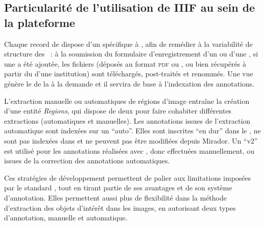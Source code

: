 \hypertarget{particularite-de-utilisation-de-iiif-au-sein-de-la-plateforme}{%
\subsection{Particularité de l'utilisation de IIIF au sein de la
plateforme}\label{particularite-de-utilisation-de-iiif-au-sein-de-la-plateforme}}

Chaque record de \digit dispose d'un \man \iiif spécifique à \eida,
afin de remédier à la variabilité de structure des \mans~: à
la soumission du formulaire d'enregistrement d'un \wit ou d'une \ser, si une \digit a été
ajoutée, les fichiers (déposés au format \textsc{pdf} ou \jpeg, ou bien récupérés à
partir du \man d'une institution) sont téléchargés,
post-traités et renommés. Une vue génère le \man de la
\digit à la demande et il servira de base à l'indexation des
annotations.

L'extraction manuelle ou automatiques de régions d'image entraîne la
création d'une entité \textit{Regions}, qui dispose de deux \mans pour
faire cohabiter différentes extractions (automatiques et manuelles). Les
annotations issues de l'extraction automatique sont indexées sur un
\man ``auto''. Elles sont inscrites ``en dur'' dans le
\man, ne sont pas indexées dans \sas et ne peuvent pas être
modifiées depuis Mirador. Un \man ``v2'' est utilisé pour les
annotations réalisées avec \sas, donc effectuées manuellement, ou issues
de la correction des annotations automatiques.

Ces stratégies de développement permettent de palier aux limitations
imposées par le standard \iiif, tout en tirant partie de ses avantages et
de son système d'annotation. Elles permettent aussi plus de flexibilité
dans la méthode d'extraction des objets d'intérêt dans les images, en
autorisant deux types d'annotation, manuelle et automatique.